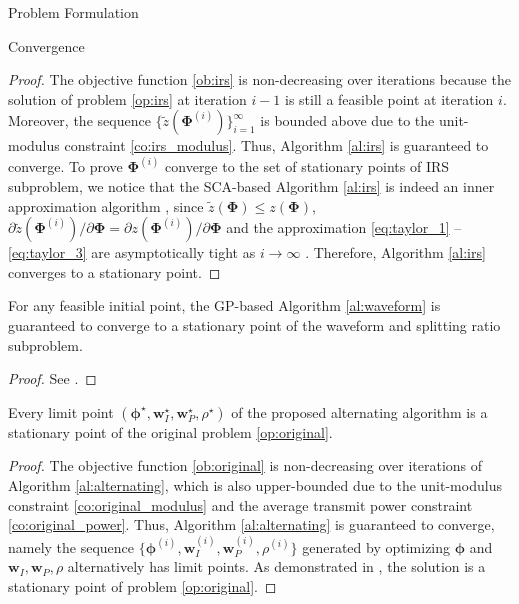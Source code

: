 \documentclass[journal]{IEEEtran}
\begin{document}
\begin{section}{Problem Formulation}
\begin{subsection}{Convergence}
			\begin{proof}\label{pf:irs}
				The objective function \ref{ob:irs} is non-decreasing over iterations because the solution of problem \ref{op:irs} at iteration $i-1$ is still a feasible point at iteration $i$. Moreover, the sequence $\{\tilde{z}(\boldsymbol{\Phi}^{(i)})\}_{i=1}^{\infty}$ is bounded above due to the unit-modulus constraint \ref{co:irs_modulus}. Thus, Algorithm \ref{al:irs} is guaranteed to converge. To prove $\boldsymbol{\Phi}^{(i)}$ converge to the set of stationary points of IRS subproblem, we notice that the SCA-based Algorithm \ref{al:irs} is indeed an inner approximation algorithm \cite{Marks1978}, since $\tilde{z}(\boldsymbol{\Phi}) \le z(\boldsymbol{\Phi})$, $\partial\tilde{z}(\boldsymbol{\Phi}^{(i)})/\partial\boldsymbol{\Phi}=\partial z(\boldsymbol{\Phi}^{(i)})/\partial\boldsymbol{\Phi}$ and the approximation \ref{eq:taylor_1} -- \ref{eq:taylor_3} are asymptotically tight as $i \to \infty$ \cite{Adali2010,Li2013}. Therefore, Algorithm \ref{al:irs} converges to a stationary point.
			\end{proof}

			\begin{proposition}\label{pr:waveform}
				For any feasible initial point, the GP-based Algorithm \ref{al:waveform} is guaranteed to converge to a stationary point of the waveform and splitting ratio subproblem.
			\end{proposition}

			\begin{proof}\label{pf:waveform}
				See \cite{Clerckx2016a,Clerckx2018b}.
			\end{proof}

			\begin{proposition}\label{pr:ao}
				Every limit point $(\boldsymbol{\phi}^{\star},\boldsymbol{w}_I^{\star},\boldsymbol{w}_P^{\star},\rho^{\star})$ of the proposed alternating algorithm is a stationary point of the original problem \ref{op:original}.
			\end{proposition}

			\begin{proof}\label{pf:ao}
				The objective function \ref{ob:original} is non-decreasing over iterations of Algorithm \ref{al:alternating}, which is also upper-bounded due to the unit-modulus constraint \ref{co:original_modulus} and the average transmit power constraint \ref{co:original_power}. Thus, Algorithm \ref{al:alternating} is guaranteed to converge, namely the sequence $\{\boldsymbol{\phi}^{(i)},\boldsymbol{w}_I^{(i)},\boldsymbol{w}_P^{(i)},\rho^{(i)}\}$ generated by optimizing $\boldsymbol{\phi}$ and $\boldsymbol{w}_I,\boldsymbol{w}_P,\rho$ alternatively has limit points. As demonstrated in \cite{Grippo2000,Hong2016,Li2013a}, the solution is a stationary point of problem \ref{op:original}.
			\end{proof}
		\end{subsection}
	\end{section}
\end{document}
